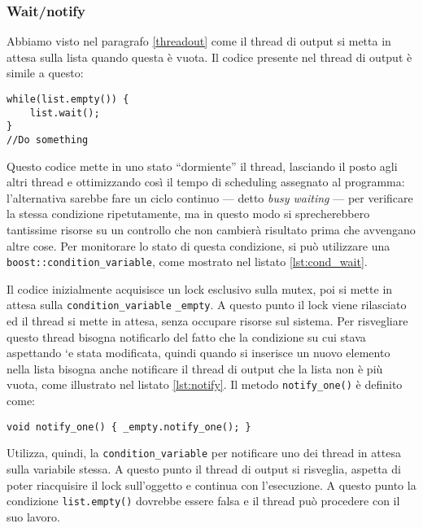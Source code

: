 \subsubsection{Wait/notify}
Abbiamo visto nel paragrafo \ref{threadout} come il thread di output si metta in
attesa sulla lista quando questa \`e vuota. Il codice presente nel thread di
output \`e simile a questo:
\begin{lstlisting}
while(list.empty()) {
    list.wait();
}
//Do something
\end{lstlisting}

Questo codice mette in uno stato ``dormiente'' il thread, lasciando il posto
agli altri thread e ottimizzando cos\`i il tempo di scheduling assegnato al
programma: l'alternativa sarebbe fare un ciclo continuo --- detto \emph{busy waiting} --- per verificare la stessa
condizione ripetutamente, ma in questo modo si sprecherebbero tantissime risorse
su un controllo che non cambier\`a risultato prima che avvengano altre cose. Per
monitorare lo stato di questa condizione, si pu\`o utilizzare una
\texttt{boost::condition\_variable}, come mostrato nel listato \ref{lst:cond_wait}.

Il codice inizialmente acquisisce un lock esclusivo sulla mutex, poi si mette in
attesa sulla \texttt{condition\_variable} \texttt{\_empty}. A questo punto
il lock viene rilasciato ed il thread si mette in attesa, senza occupare risorse
sul sistema. Per risvegliare questo thread bisogna notificarlo del fatto che la
condizione su cui stava aspettando `e stata modificata, quindi quando si
inserisce un nuovo elemento nella lista bisogna anche notificare il thread di
output che la lista non \`e pi\`u vuota, come illustrato nel listato
\ref{lst:notify}. Il metodo \texttt{notify\_one()} \`e definito come:
\begin{lstlisting}[frame=none]
    void notify_one() { _empty.notify_one(); }
\end{lstlisting}
Utilizza, quindi, la \texttt{condition\_variable} per notificare uno dei thread
in attesa sulla variabile stessa. A questo punto il thread di output si
risveglia, aspetta di poter riacquisire il lock sull'oggetto e continua con
l'esecuzione. A questo punto la condizione \texttt{list.empty()} dovrebbe
essere falsa e il thread pu\`o procedere con il suo lavoro.


